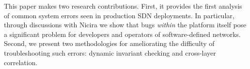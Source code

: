This paper makes two research contributions. First, it provides the first
analysis of common system errors seen in production SDN deployments. In
particular, through discussions with Nicira we show that bugs {\it within} the platform
itself pose a significant problem for developers and operators of software-defined
networks. Second, we present two methodologies for ameliorating the difficulty of
troubleshooting such errors: dynamic invariant checking and cross-layer
correlation.
